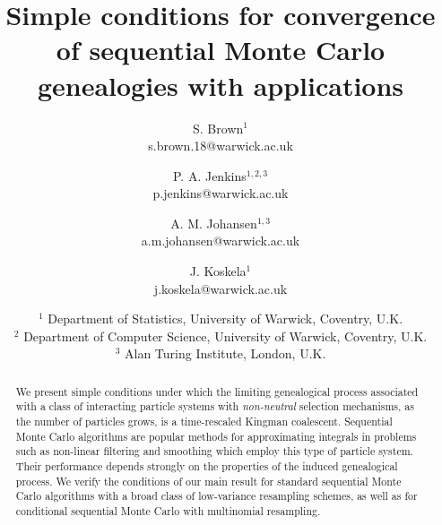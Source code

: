 \documentclass{article} %
\theoremstyle{definition}
\newcommand{\1}[1]{\mathbbm{1}_{\{#1\}}}
\begin{document}



\title{Simple conditions for convergence of sequential Monte Carlo genealogies with applications}

\author{S. Brown$^{1}$\\s.brown.18@warwick.ac.uk \and P. A. Jenkins$^{1,2,3}$\\p.jenkins@warwick.ac.uk \and A. M. Johansen$^{1,3}$\\a.m.johansen@warwick.ac.uk \and J. Koskela$^{1}$\\j.koskela@warwick.ac.uk} 
{\date{\small $^1$ Department of Statistics, University of Warwick, Coventry, U.K.\\[2pt]
$^2$ Department of Computer Science, University of Warwick, Coventry, U.K.\\[2pt]
$^3$ Alan Turing Institute, London, U.K.}}

\maketitle

\begin{abstract}
We present simple conditions under which the limiting genealogical process associated with a class of interacting particle systems with \emph{non-neutral} selection mechanisms, as the number of particles grows, is a time-rescaled Kingman coalescent. Sequential Monte Carlo algorithms are popular methods for approximating integrals in problems such as non-linear filtering and smoothing which employ this type of particle system. Their performance depends strongly on the properties of the induced genealogical process. We verify the conditions of our main result for standard sequential Monte Carlo algorithms with a broad class of low-variance resampling schemes, as well as for conditional sequential Monte Carlo with multinomial resampling.
\end{abstract}
\end{document}
